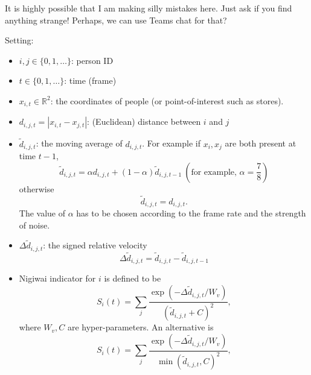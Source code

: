 \documentclass[a4paper,12pt]{amsart}
\theoremstyle{definition}
\numberwithin{equation}{section}
\newcommand{\R}{\mathbb{R}}
\begin{document}
It is highly possible that I am making silly mistakes here.
Just ask if you find anything strange!
Perhaps, we can use Teams chat for that?

\medskip

Setting:
\begin{itemize}
\item $i,j \in \{0,1,\ldots \}$: person ID
\item $t\in \{0,1,\ldots \}$: time (frame)
\item $x_{i,t} \in \R^2$: the coordinates of people (or point-of-interest such as stores).
\item $d_{i,j,t} = |x_{i,t}-x_{j,t}|$: (Euclidean) distance between $i$ and $j$
\item $\tilde{d}_{i,j,t}$: the moving average of $d_{i,j,t}$. For example
if $x_i,x_j$ are both present at time $t-1$, 
\[
 \tilde{d}_{i,j,t} = \alpha d_{i,j,t} + (1-\alpha) \tilde{d}_{i,j,t-1} \ (\text{for example, } \alpha=\frac{7}{8})
\]
otherwise
\[
 \tilde{d}_{i,j,t} = {d}_{i,j,t}.
\]
The value of $\alpha$ has to be chosen according to the frame rate and the strength of noise.
\item $\Delta \tilde{d}_{i,j,t}$: the signed relative velocity
\[
 \Delta \tilde{d}_{i,j,t} = \tilde{d}_{i,j,t} - \tilde{d}_{i,j,t-1}
\]
\item Nigiwai indicator for $i$ is defined to be
\[
 S_i(t) = \sum_{j} \dfrac{\exp(-\Delta \tilde{d}_{i,j,t}/W_v)}{(\tilde{d}_{i,j,t}+C)^2},
\]
where $W_v, C$ are hyper-parameters.
An alternative is
\[
 S_i(t) = \sum_{j} \dfrac{\exp(-\Delta \tilde{d}_{i,j,t}/W_v)}{\min(\tilde{d}_{i,j,t},C)^2},
\]
\end{itemize}
\end{document}
